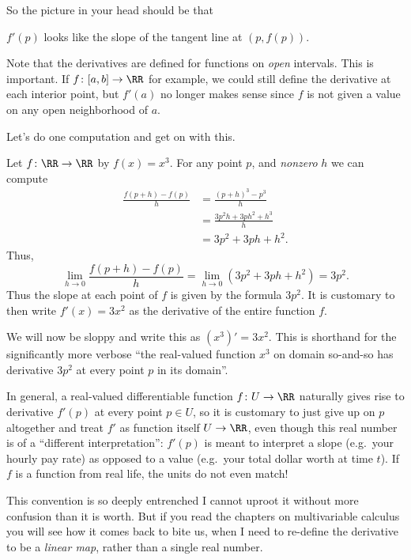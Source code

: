 So the picture in your head should be that
\begin{moral}
	$f'(p)$ looks like the slope of the tangent line at $(p, f(p))$.
\end{moral}

\begin{remark}
	Note that the derivatives are defined
	for functions on \emph{open} intervals.
	This is important.
	If $f \colon [a,b] \to \RR$ for example,
	we could still define the derivative at each interior point,
	but $f'(a)$ no longer makes sense
	since $f$ is not given a value on any open neighborhood of $a$.
\end{remark}

Let's do one computation and get on with this.
\begin{example}
	[Derivative of $x^3$ is $3x^2$]
	Let $f \colon \RR \to \RR$ by $f(x) = x^3$.
	For any point $p$, and \emph{nonzero} $h$ we can compute
	\begin{align*}
		\frac{f(p+h) - f(p)}{h} &= \frac{(p+h)^3 - p^3}{h} \\
		&= \frac{3p^2h + 3ph^2 + h^3}{h} \\
		&= 3p^2 + 3ph + h^2.
	\end{align*}
	Thus,
	\[ \lim_{h \to 0} \frac{f(p+h)-f(p)}{h}
		= \lim_{h \to 0} (3p^2+3ph+h^2) = 3p^2. \]
	Thus the slope at each point of $f$ is given by the formula $3p^2$.
	It is customary to then write $f'(x) = 3x^2$
	as the derivative of the entire function $f$.
\end{example}
\begin{abuse}
	We will now be sloppy and write this as $(x^3)' = 3x^2$.
	This is shorthand for the significantly more verbose
	``the real-valued function $x^3$ on domain so-and-so
	has derivative $3p^2$ at every point $p$ in its domain''.

	In general, a real-valued differentiable function
	$f \colon U \to \RR$ naturally gives rise to derivative
	$f'(p)$ at every point $p \in U$,
	so it is customary to just give up on $p$ altogether
	and treat $f'$ as function itself $U \to \RR$,
	even though this real number is of a ``different interpretation'':
	$f'(p)$ is meant to interpret a slope (e.g.\ your hourly pay rate)
	as opposed to a value (e.g.\ your total dollar worth at time $t$).
	If $f$ is a function from real life, the units do not even match!

	This convention is so deeply entrenched I cannot uproot it
	without more confusion than it is worth.
	But if you read the chapters on multivariable calculus
	you will see how it comes back to bite us,
	when I need to re-define the derivative to be a \emph{linear map},
	rather than a single real number.
\end{abuse}

